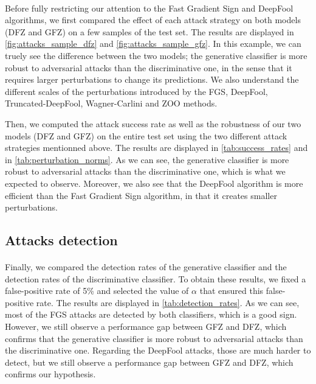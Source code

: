 \documentclass[10pt,twocolumn,letterpaper]{article}
\begin{document}
\paragraph{} Before fully restricting our attention to the Fast Gradient Sign and DeepFool algorithms, we first compared the effect of each attack strategy on both models (DFZ and GFZ) on a few samples of the test set. The results are displayed in \cref{fig:attacks_sample_dfz} and \cref{fig:attacks_sample_gfz}. In this example, we can truely see the difference between the two models; the generative classifier is more robust to adversarial attacks than the discriminative one, in the sense that it requires larger perturbations to change its predictions. We also understand the different scales of the perturbations introduced by the FGS, DeepFool, Truncated-DeepFool, Wagner-Carlini and ZOO methods.

Then, we computed the attack success rate as well as the robustness of our two models (DFZ and GFZ) on the entire test set using the two different attack strategies mentionned above. The results are displayed in \cref{tab:success_rates} and in \cref{tab:perturbation_norms}. As we can see, the generative classifier is more robust to adversarial attacks than the discriminative one, which is what we expected to observe. Moreover, we also see that the DeepFool algorithm is more efficient than the Fast Gradient Sign algorithm, in that it creates smaller perturbations.

\subsection{Attacks detection}

\paragraph{} Finally, we compared the detection rates of the generative classifier and the detection rates of the discriminative classifier. To obtain these results, we fixed a false-positive rate of 5\% and selected the value of $\alpha$ that ensured this false-positive rate. The results are displayed in \cref{tab:detection_rates}. As we can see, most of the FGS attacks are detected by both classifiers, which is a good sign. However, we still observe a performance gap between GFZ and DFZ, which confirms that the generative classifier is more robust to adversarial attacks than the discriminative one. Regarding the DeepFool attacks, those are much harder to detect, but we still observe a performance gap between GFZ and DFZ, which confirms our hypothesis.
\end{document}
